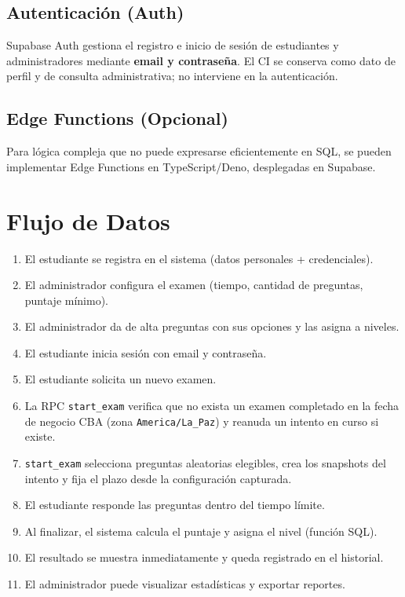 \subsection{Autenticación (Auth)}

Supabase Auth gestiona el registro e inicio de sesión de estudiantes y administradores mediante \textbf{email y contraseña}. El CI se conserva como dato de perfil y de consulta administrativa; no interviene en la autenticación.

\subsection{Edge Functions (Opcional)}

Para lógica compleja que no puede expresarse eficientemente en SQL, se pueden implementar Edge Functions en TypeScript/Deno, desplegadas en Supabase.

\section{Flujo de Datos}

\begin{enumerate}
    \item El estudiante se registra en el sistema (datos personales + credenciales).
    \item El administrador configura el examen (tiempo, cantidad de preguntas, puntaje mínimo).
    \item El administrador da de alta preguntas con sus opciones y las asigna a niveles.
    \item El estudiante inicia sesión con email y contraseña.
    \item El estudiante solicita un nuevo examen.
    \item La RPC \texttt{start\_exam} verifica que no exista un examen completado en la fecha de negocio CBA (zona \texttt{America/La\_Paz}) y reanuda un intento en curso si existe.
    \item \texttt{start\_exam} selecciona preguntas aleatorias elegibles, crea los snapshots del intento y fija el plazo desde la configuración capturada.
    \item El estudiante responde las preguntas dentro del tiempo límite.
    \item Al finalizar, el sistema calcula el puntaje y asigna el nivel (función SQL).
    \item El resultado se muestra inmediatamente y queda registrado en el historial.
    \item El administrador puede visualizar estadísticas y exportar reportes.
\end{enumerate}
